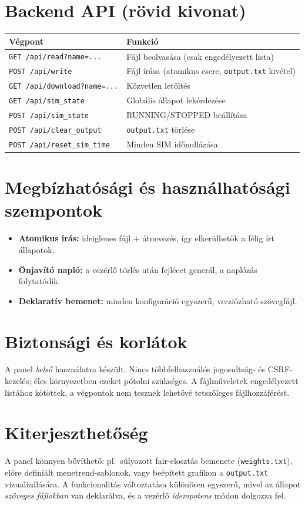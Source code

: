 \section{Backend API (rövid kivonat)}
\begin{center}
\begin{tabular}{ll}
\hline
\textbf{Végpont} & \textbf{Funkció} \\
\hline
\texttt{GET\ /api/read?name=...} & Fájl beolvasása (csak engedélyezett lista) \\
\texttt{POST\ /api/write} & Fájl írása (atomikus csere, \texttt{output.txt} kivétel) \\
\texttt{GET\ /api/download?name=...} & Közvetlen letöltés \\
\texttt{GET\ /api/sim\_state} & Globális állapot lekérdezése \\
\texttt{POST\ /api/sim\_state} & RUNNING/STOPPED beállítása \\
\texttt{POST\ /api/clear\_output} & \texttt{output.txt} törlése \\
\texttt{POST\ /api/reset\_sim\_time} & Minden SIM időnullázása \\
\hline
\end{tabular}
\end{center}

\section{Megbízhatósági és használhatósági szempontok}
\begin{itemize}
  \item \textbf{Atomikus írás:} ideiglenes fájl + átnevezés, így elkerülhetők a félig írt állapotok.
  \item \textbf{Önjavító napló:} a vezérlő törlés után fejlécet generál, a naplózás folytatódik.
  \item \textbf{Deklaratív bemenet:} minden konfiguráció egyszerű, verziózható szövegfájl.
\end{itemize}

\section{Biztonsági és korlátok}
A panel \emph{belső} használatra készült. Nincs többfelhasználós jogosultság- és CSRF-kezelés; 
éles környezetben ezeket pótolni szükséges. A fájlműveletek engedélyezett listához kötöttek, 
a végpontok nem tesznek lehetővé tetszőleges fájlhozzáférést.

\section{Kiterjeszthetőség}
A panel könnyen bővíthető: pl.\ súlyozott fair-elosztás bemenete (\texttt{weights.txt}), 
előre definiált menetrend-sablonok, vagy beépített grafikon a \texttt{output.txt} vizualizálására. 
A funkcionalitás változtatása különösen egyszerű, mivel az állapot \emph{szöveges fájlokban} 
van deklarálva, és a vezérlő \emph{idempotens} módon dolgozza fel.

